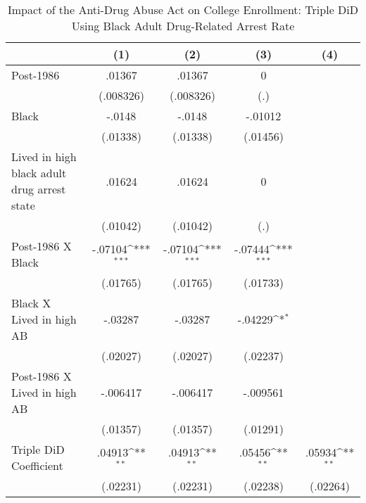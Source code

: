\begin{table}[htbp]\centering
\def\sym#1{\ifmmode^{#1}\else\(^{#1}\)\fi}
\caption{Impact of the Anti-Drug Abuse Act on College Enrollment: Triple DiD Using Black Adult Drug-Related Arrest Rate}
\begin{tabular}{l*{4}{c}}
\hline\hline
                    &\multicolumn{1}{c}{(1)}         &\multicolumn{1}{c}{(2)}         &\multicolumn{1}{c}{(3)}         &\multicolumn{1}{c}{(4)}         \\
\hline
Post-1986           &      .01367         &      .01367         &           0         &                     \\
                    &   (.008326)         &   (.008326)         &         (.)         &                     \\
[1em]
Black               &      -.0148         &      -.0148         &     -.01012         &                     \\
                    &    (.01338)         &    (.01338)         &    (.01456)         &                     \\
[1em]
Lived in high black adult drug arrest state&      .01624         &      .01624         &           0         &                     \\
                    &    (.01042)         &    (.01042)         &         (.)         &                     \\
[1em]
Post-1986 X Black   &     -.07104\sym{***}&     -.07104\sym{***}&     -.07444\sym{***}&                     \\
                    &    (.01765)         &    (.01765)         &    (.01733)         &                     \\
[1em]
Black X Lived in high AB&     -.03287         &     -.03287         &     -.04229\sym{*}  &                     \\
                    &    (.02027)         &    (.02027)         &    (.02237)         &                     \\
[1em]
Post-1986 X Lived in high AB&    -.006417         &    -.006417         &    -.009561         &                     \\
                    &    (.01357)         &    (.01357)         &    (.01291)         &                     \\
[1em]
Triple DiD Coefficient&      .04913\sym{**} &      .04913\sym{**} &      .05456\sym{**} &      .05934\sym{**} \\
                    &    (.02231)         &    (.02231)         &    (.02238)         &    (.02264)         \\

\end{tabular}
\end{table}
